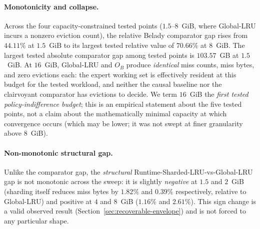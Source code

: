 

\paragraph{Monotonicity and collapse.} Across the four capacity-constrained
tested points ($1.5$--$8$~GiB, where Global-LRU incurs a nonzero eviction
count), the relative Belady comparator gap rises from $44.11\%$ at
$1.5$~GiB to its largest tested relative value of $70.66\%$ at $8$~GiB.
The largest tested absolute comparator gap among tested points is
$103.57$~GB at $1.5$~GiB. At $16$~GiB, Global-LRU and $O_B$ produce
\emph{identical} miss counts, miss bytes, and zero evictions each: the
expert working set is effectively resident at this budget for the tested
workload, and neither the causal baseline nor the clairvoyant comparator
has evictions to decide. We term $16$~GiB the \emph{first tested
policy-indifference budget}; this is an empirical statement about the
five tested points, not a claim about the mathematically minimal
capacity at which convergence occurs (which may be lower; it was not
swept at finer granularity above $8$~GiB).

\paragraph{Non-monotonic structural gap.} Unlike the comparator gap, the
\emph{structural} Runtime-Sharded-LRU-vs-Global-LRU gap is not monotonic
across the sweep: it is slightly \emph{negative} at $1.5$ and $2$~GiB
(sharding itself reduces miss bytes by $1.82\%$ and $0.39\%$ respectively,
relative to Global-LRU) and positive at $4$ and $8$~GiB ($1.16\%$ and
$2.61\%$). This sign change is a valid observed result
(Section~\ref{sec:recoverable-envelope}) and is not forced to any
particular shape.
